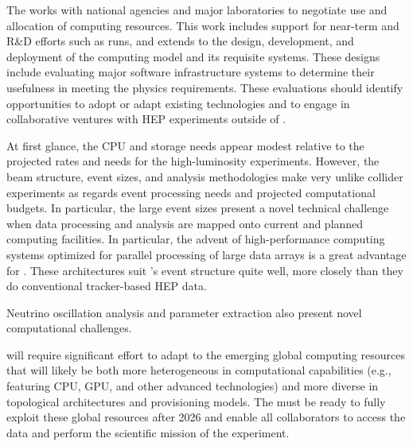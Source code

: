 The  works with national agencies and major laboratories to negotiate use and allocation of computing resources.  This work includes support for near-term and R\&D efforts %
such as  runs, and extends to the design, development, and deployment of the  computing model and its requisite systems. 
These designs include evaluating major software infrastructure systems to determine their usefulness %
in meeting the  physics requirements.   These evaluations should identify opportunities to adopt or adapt existing technologies and to engage in collaborative ventures with HEP experiments outside of . 


At first glance,  the  CPU and storage needs %
appear modest %
relative to the projected rates and needs for the high-luminosity  experiments.  
However, the  beam structure, event sizes, and analysis methodologies make  very unlike collider experiments %
as regards event processing needs and projected computational budgets.  In particular, the large  event sizes present a novel technical challenge when data processing and analysis are mapped onto  current and planned computing facilities.  %
In particular, the advent of high-performance computing systems optimized for parallel processing of large data arrays is a great advantage for . These architectures suit 's event structure quite well, more closely than they do conventional tracker-based HEP data. 

Neutrino oscillation analysis and parameter extraction also present novel computational challenges.  

 will require significant effort to adapt to the emerging  %
global computing resources that %
will  likely be both more heterogeneous in computational capabilities (e.g., featuring CPU, GPU, and other advanced technologies) and more diverse in topological architectures and provisioning models.  The   must %
be ready to fully exploit these global resources %
after 2026 and enable all collaborators to access the data and perform the scientific mission of the experiment.  



